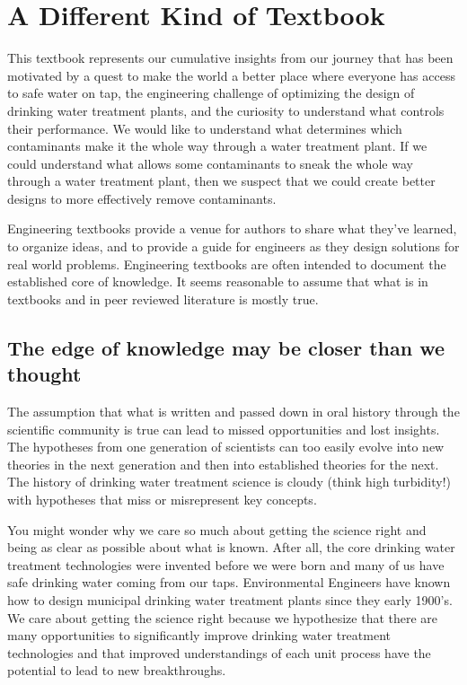 \documentclass[letterpaper,10pt,english]{sphinxmanual}
\begin{document}
\section{A Different Kind of Textbook}
\label{\detokenize{Introduction/Introduction:a-different-kind-of-textbook}}\label{\detokenize{Introduction/Introduction:heading-a-different-kind-of-textbook}}
This textbook represents our cumulative insights from our journey that has been motivated by a quest to make the world a better place where everyone has access to safe water on tap, the engineering challenge of optimizing the design of drinking water treatment plants, and the curiosity to understand what controls their performance. We would like to understand what determines which contaminants make it the whole way through a water treatment plant. If we could understand what allows some contaminants to sneak the whole way through a water treatment plant, then we suspect that we could create better designs to more effectively remove contaminants.

Engineering textbooks provide a venue for authors to share what they’ve learned, to organize ideas, and to provide a guide for engineers as they design solutions for real world problems. Engineering textbooks are often intended to document the established core of knowledge. It seems reasonable to assume that what is in textbooks and in peer reviewed literature is mostly true.


\subsection{The edge of knowledge may be closer than we thought}
\label{\detokenize{Introduction/Introduction:the-edge-of-knowledge-may-be-closer-than-we-thought}}\label{\detokenize{Introduction/Introduction:heading-edge-of-knowledge}}
The assumption that what is written and passed down in oral history through the scientific community is true can lead to missed opportunities and lost insights. The hypotheses from one generation of scientists can too easily evolve into new theories in the next generation and then into established theories for the next. The history of drinking water treatment science is cloudy (think high turbidity!) with hypotheses that miss or misrepresent key concepts.

You might wonder why we care so much about getting the science right and being as clear as possible about what is known. After all, the core drinking water treatment technologies were invented before we were born and many of us have safe drinking water coming from our taps. Environmental Engineers have known how to design municipal drinking water treatment plants since they early 1900’s. We care about getting the science right because we hypothesize that there are many opportunities to significantly improve drinking water treatment technologies and that improved understandings of each unit process have the potential to lead to new breakthroughs.
\end{document}
